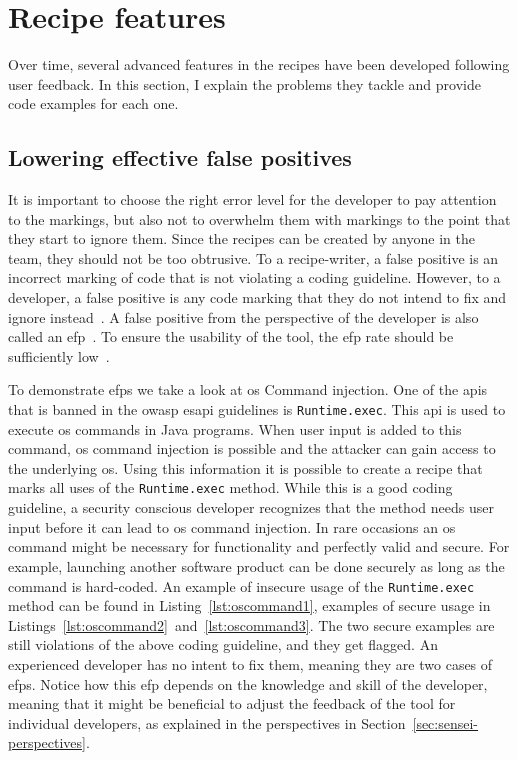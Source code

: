 \section{Recipe features}
\label{sec:features}

Over time, several advanced features in the recipes have been developed following user feedback.
In this section, I explain the problems they tackle and provide code examples for each one.

\subsection{Lowering effective false positives}
\label{sec:efp}
It is important to choose the right error level for the developer to pay attention to the markings, but also not to overwhelm them with markings to the point that they start to ignore them.
Since the recipes can be created by anyone in the team, they should not be too obtrusive.
To a recipe-writer, a false positive is an incorrect marking of code that is not violating a coding guideline.
However, to a developer, a false positive is any code marking that they do not intend to fix and ignore instead~\cite{ayewah2007evaluating}.
A false positive from the perspective of the developer is also called an \gls{efp}~\cite{sadowski2015tricorder}.
To ensure the usability of the tool, the \gls{efp} rate should be sufficiently low~\cite{sadowski2015tricorder,johnson2013don}.

To demonstrate \glspl{efp} we take a look at \gls{os} Command injection.
One of the \glspl{api} that is banned in the \gls{owasp} \gls{esapi} guidelines is \texttt{Runtime.exec}.
This \gls{api} is used to execute \gls{os} commands in Java programs.
When user input is added to this command, \gls{os} command injection is possible and the attacker can gain access to the underlying \gls{os}.
Using this information it is possible to create a recipe that marks all uses of the \texttt{Runtime.exec} method.
While this is a good coding guideline, a security conscious developer recognizes that the method needs user input before it can lead to \gls{os} command injection.
In rare occasions an \gls{os} command might be necessary for functionality and perfectly valid and secure.
For example, launching another software product can be done securely as long as the command is hard-coded.
An example of insecure usage of the \texttt{Runtime.exec} method can be found in Listing~\ref{lst:oscommand1}, examples of secure usage in Listings~\ref{lst:oscommand2}~and~\ref{lst:oscommand3}.
The two secure examples are still violations of the above coding guideline, and they get flagged.
An experienced developer has no intent to fix them, meaning they are two cases of \glspl{efp}.
Notice how this \gls{efp} depends on the knowledge and skill of the developer, meaning that it might be beneficial to adjust the feedback of the tool for individual developers, as explained in the perspectives in Section~\ref{sec:sensei-perspectives}.

